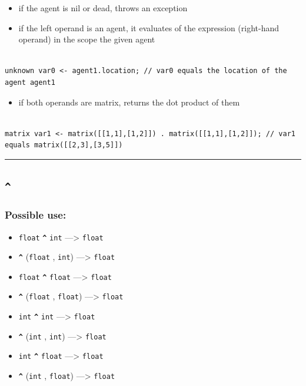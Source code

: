 \documentclass[]{book}
\providecommand{\tightlist}{%
  \setlength{\itemsep}{0pt}\setlength{\parskip}{0pt}}
\theoremstyle{definition}
\theoremstyle{definition}
\theoremstyle{definition}
\theoremstyle{remark}
\begin{document}
\begin{itemize}
\tightlist
\item
  if the agent is nil or dead, throws an exception\\
\item
  if the left operand is an agent, it evaluates of the expression
  (right-hand operand) in the scope the given agent
\end{itemize}

\begin{verbatim}
 
unknown var0 <- agent1.location; // var0 equals the location of the agent agent1
\end{verbatim}

\begin{itemize}
\tightlist
\item
  if both operands are matrix, returns the dot product of them
\end{itemize}

\begin{verbatim}
 
matrix var1 <- matrix([[1,1],[1,2]]) . matrix([[1,1],[1,2]]); // var1 equals matrix([[2,3],[3,5]])
\end{verbatim}

\begin{center}\rule{0.5\linewidth}{\linethickness}\end{center}

\subsection{\texorpdfstring{\texttt{\^{}}}{\^{}}}\label{section-8}

\subsubsection{Possible use:}\label{possible-use-8}

\begin{itemize}
\tightlist
\item
  \texttt{float} \textbf{\texttt{\^{}}} \texttt{int} ---\textgreater{}
  \texttt{float}
\item
  \textbf{\texttt{\^{}}} (\texttt{float} , \texttt{int})
  ---\textgreater{} \texttt{float}
\item
  \texttt{float} \textbf{\texttt{\^{}}} \texttt{float} ---\textgreater{}
  \texttt{float}
\item
  \textbf{\texttt{\^{}}} (\texttt{float} , \texttt{float})
  ---\textgreater{} \texttt{float}
\item
  \texttt{int} \textbf{\texttt{\^{}}} \texttt{int} ---\textgreater{}
  \texttt{float}
\item
  \textbf{\texttt{\^{}}} (\texttt{int} , \texttt{int}) ---\textgreater{}
  \texttt{float}
\item
  \texttt{int} \textbf{\texttt{\^{}}} \texttt{float} ---\textgreater{}
  \texttt{float}
\item
  \textbf{\texttt{\^{}}} (\texttt{int} , \texttt{float})
  ---\textgreater{} \texttt{float}
\end{itemize}
\end{document}
